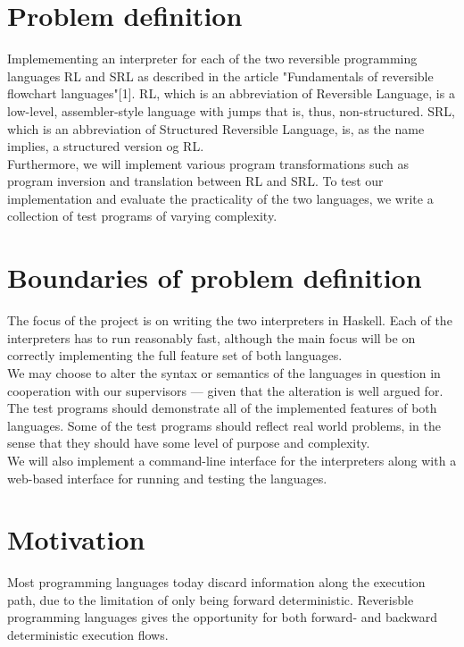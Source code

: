 \section{Problem definition}
\label{sec:problem_definition}
Implemementing an interpreter for each of the two reversible programming languages RL and SRL as described in the article "Fundamentals of reversible flowchart languages"[1]. RL, which is an abbreviation of Reversible Language, is a low-level, assembler-style language with jumps that is, thus, non-structured. SRL, which is an abbreviation of Structured Reversible Language, is, as the name implies, a structured version og RL. \\
\indent Furthermore, we will implement various program transformations such as program inversion and translation between RL and SRL. %
To test our implementation and evaluate the practicality of the two languages, we write a collection of test programs of varying complexity.

\section{Boundaries of problem definition}
\label{sec:boundaries_of_problem_definition}

The focus of the project is on writing the two interpreters in Haskell. Each of the interpreters has to run reasonably fast, although the main focus will be on correctly implementing the full feature set of both languages. \\
\indent We may choose to alter the syntax or semantics of the languages in question in cooperation with our supervisors --- given that the alteration is well argued for. \\
\indent The test programs should demonstrate all of the implemented features of both languages. Some of the test programs should reflect real world problems, in the sense that they should have some level of purpose and complexity. \\
\indent We will also implement a command-line interface for the interpreters along with a web-based interface for running and testing the languages.

\section{Motivation}
\label{sec:motivation}
Most programming languages today discard information along the execution path, due to the limitation of only being forward deterministic. Reverisble programming languages gives the opportunity for both forward- and backward deterministic execution flows.

